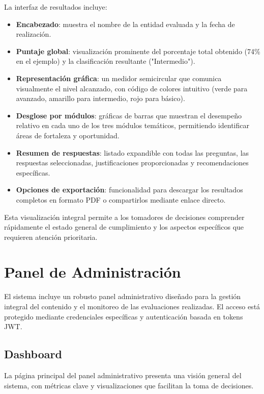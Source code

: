 \documentclass[12pt,a4paper]{report}
\begin{document}
La interfaz de resultados incluye:
\begin{itemize}[leftmargin=*]
    \item \textbf{Encabezado}: muestra el nombre de la entidad evaluada y la fecha de realización.
    \item \textbf{Puntaje global}: visualización prominente del porcentaje total obtenido (74\% en el ejemplo) y la clasificación resultante ("Intermedio").
    \item \textbf{Representación gráfica}: un medidor semicircular que comunica visualmente el nivel alcanzado, con código de colores intuitivo (verde para avanzado, amarillo para intermedio, rojo para básico).
    \item \textbf{Desglose por módulos}: gráficas de barras que muestran el desempeño relativo en cada uno de los tres módulos temáticos, permitiendo identificar áreas de fortaleza y oportunidad.
    \item \textbf{Resumen de respuestas}: listado expandible con todas las preguntas, las respuestas seleccionadas, justificaciones proporcionadas y recomendaciones específicas.
    \item \textbf{Opciones de exportación}: funcionalidad para descargar los resultados completos en formato PDF o compartirlos mediante enlace directo.
\end{itemize}

Esta visualización integral permite a los tomadores de decisiones comprender rápidamente el estado general de cumplimiento y los aspectos específicos que requieren atención prioritaria.

\chapter{Panel de Administración}
El sistema incluye un robusto panel administrativo diseñado para la gestión integral del contenido y el monitoreo de las evaluaciones realizadas. El acceso está protegido mediante credenciales específicas y autenticación basada en tokens JWT.

\section{Dashboard}
La página principal del panel administrativo presenta una visión general del sistema, con métricas clave y visualizaciones que facilitan la toma de decisiones.
\end{document}
